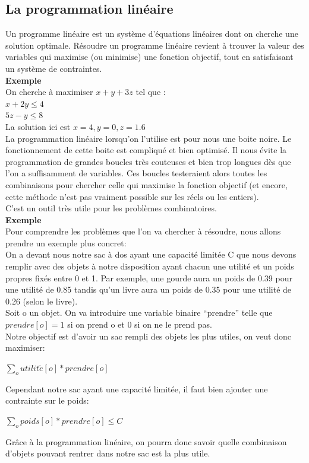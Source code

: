 \documentclass[a4paper]{article}
\begin{document}
\subsection{La programmation linéaire}
  Un programme linéaire est un système d’équations linéaires dont on cherche une solution optimale. Résoudre un programme linéaire revient à trouver la valeur des variables qui maximise (ou minimise) une fonction objectif, tout en satisfaisant un système de contraintes.\vspace{1\baselineskip}\\
\textbf{Exemple}\\
  On cherche à maximiser $x + y + 3z$ tel que : \\
  $x + 2y \leq 4$\\
  $5z - y \leq 8$\\
  La solution ici est $x = 4, y = 0, z = 1.6$\vspace{1\baselineskip}\\
La programmation linéaire lorsqu'on l'utilise est pour nous une boite noire. Le fonctionnement de cette boite est compliqué et bien optimisé. Il nous évite la programmation de grandes boucles très couteuses et bien trop longues dès que l'on a suffisamment de variables. Ces boucles testeraient alors toutes les combinaisons pour chercher celle qui maximise la fonction objectif (et encore, cette méthode n'est pas vraiment possible sur les réels ou les entiers).\\
C'est un outil très utile pour les problèmes combinatoires.\vspace{1\baselineskip}\\
\textbf{Exemple}\\
  Pour comprendre les problèmes que l'on va chercher à résoudre, nous allons prendre un exemple plus concret:\vspace{1\baselineskip} \\
  On a devant nous notre sac à dos ayant une capacité limitée C que nous devons remplir avec des objets à notre disposition ayant chacun une utilité et un poids propres fixés entre 0 et 1. Par exemple, une gourde aura un poids de 0.39 pour une utilité de 0.85 tandis qu'un livre aura un poids de 0.35 pour une utilité de 0.26 (selon le livre).\vspace{1\baselineskip}\\
  Soit o un objet. On va introduire une variable binaire ``prendre'' telle que $prendre[o]=1$ si on prend o et 0 si on ne le prend pas. \\
  Notre objectif est d'avoir un sac rempli des objets les plus utiles, on veut donc maximiser:
  \begin{center}
    $\sum_o utilit\acute{e}[o] * prendre[o]$
  \end{center}
  Cependant notre sac ayant une capacité limitée, il faut bien ajouter une contrainte sur le poids:
  \begin{center}
    $\sum_o poids[o] * prendre[o] \leq C$
  \end{center}
  Grâce à la programmation linéaire, on pourra donc savoir quelle combinaison d'objets pouvant rentrer dans notre sac est la plus utile.
\newpage
\end{document}
